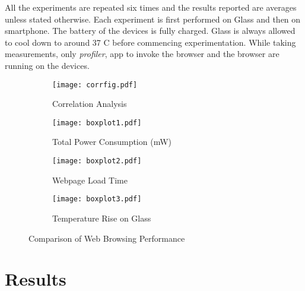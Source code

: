\documentclass{sig-alternate-10pt}
\newlength\figwidth
\begin{document}
All the experiments are repeated six times and the results reported are averages unless stated otherwise. 
Each experiment is first performed on Glass  and then  on smartphone. The battery of the devices  is fully charged. Glass is always allowed to cool down to  around 37 \degree C before  commencing experimentation.    While taking measurements,  only \textit{profiler}, app to invoke the  browser and the   browser are running on the devices. 



\begin{figure*}[!ht]
\centering
\begin{subfigure}{\figwidth}
     \texttt{[image: corrfig.pdf]}
     \caption{Correlation Analysis}
     \label{fig-corrfig}
\end{subfigure}\begin{subfigure}{\figwidth}
     \texttt{[image: boxplot1.pdf]}
     \caption{Total Power Consumption (mW)}
     \label{fig-boxplot1}
\end{subfigure}
\begin{subfigure}{\figwidth}
	\texttt{[image: boxplot2.pdf]}
    \caption{Webpage Load Time}
    \label{fig-boxplot2}
\end{subfigure}\begin{subfigure}{\figwidth}
     \texttt{[image: boxplot3.pdf]}
     \caption{Temperature Rise on Glass}
     \label{fig-boxplot3}
     \end{subfigure}
\caption{Comparison of Web Browsing Performance}
\label{fig-browserperf}
\end{figure*}































\section{Results}
\end{document}
